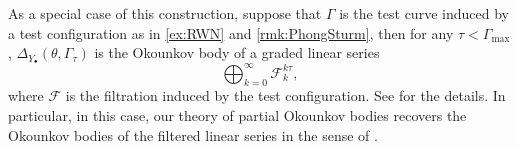 \begin{remark}\label{rmk:Okounkov:L2335}
    As a special case of this construction, suppose that $\Gamma$ is the test curve induced by a test configuration as in \cref{ex:RWN} and \cref{rmk:PhongSturm}, then for any $\tau<\Gamma_{\max}$, $\Delta_{Y_{\bullet}}(\theta,\Gamma_{\tau})$ is the Okounkov body of a graded linear series
    \[
    \bigoplus_{k=0}^{\infty}\mathcal{F}^{k\tau}_k,
    \]
    where $\mathcal{F}$ is the filtration induced by the test configuration. See \cite[Theorem~5.28]{Xia21} for the details. In particular, in this case, our theory of partial Okounkov bodies recovers the Okounkov bodies of the filtered linear series in the sense of \cite{BC11}.
\end{remark}
